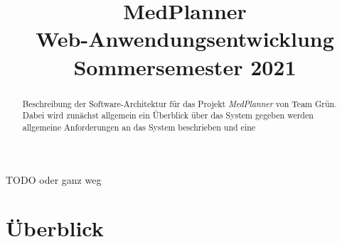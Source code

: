 \documentclass[conference]{IEEEtran}
\begin{document}
\title{MedPlanner\\
{\large Web-Anwendungsentwicklung Sommersemester 2021}
}

\author{
\and
{}
\and
{}
\and
{}
\and
{}
}

\maketitle

\begin{abstract}
Beschreibung der Software-Architektur für das Projekt \textit{MedPlanner} von Team Grün. Dabei wird zunächst allgemein ein Überblick über das System gegeben werden allgemeine Anforderungen an das System beschrieben und eine 
\end{abstract}

\begin{IEEEkeywords}
TODO oder ganz weg 
\end{IEEEkeywords}


\section{Überblick}
\end{document}
